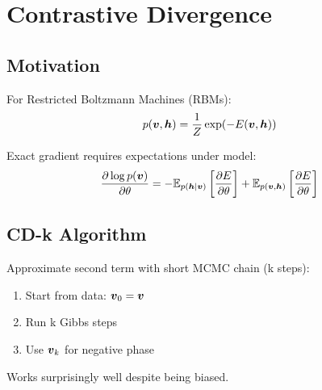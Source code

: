 
\section{Contrastive Divergence}
\label{sec:contrastive-divergence}

\subsection{Motivation}

For Restricted Boltzmann Machines (RBMs):
\begin{equation}
p(\boldsymbol{v}, \boldsymbol{h}) = \frac{1}{Z} \exp(-E(\boldsymbol{v}, \boldsymbol{h}))
\end{equation}

Exact gradient requires expectations under model:
\begin{equation}
\frac{\partial \log p(\boldsymbol{v})}{\partial \theta} = -\mathbb{E}_{p(\boldsymbol{h}|\boldsymbol{v})}\left[\frac{\partial E}{\partial \theta}\right] + \mathbb{E}_{p(\boldsymbol{v}, \boldsymbol{h})}\left[\frac{\partial E}{\partial \theta}\right]
\end{equation}

\subsection{CD-k Algorithm}

Approximate second term with short MCMC chain (k steps):
\begin{enumerate}
    \item Start from data: $\boldsymbol{v}_0 = \boldsymbol{v}$
    \item Run k Gibbs steps
    \item Use $\boldsymbol{v}_k$ for negative phase
\end{enumerate}

Works surprisingly well despite being biased.

